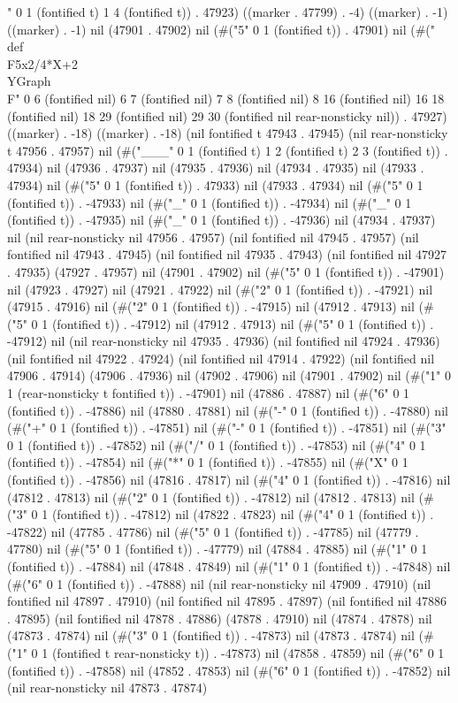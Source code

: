    " 0 1 (fontified t) 1 4 (fontified t)) . 47923) ((marker . 47799) . -4) ((marker) . -1) ((marker) . -1) nil (47901 . 47902) nil (#("5" 0 1 (fontified t)) . 47901) nil (#("\\def\\F5x{2/4*X+2}
   \\YGraph\\F" 0 6 (fontified nil) 6 7 (fontified nil) 7 8 (fontified nil) 8 16 (fontified nil) 16 18 (fontified nil) 18 29 (fontified nil) 29 30 (fontified nil rear-nonsticky nil)) . 47927) ((marker) . -18) ((marker) . -18) (nil fontified t 47943 . 47945) (nil rear-nonsticky t 47956 . 47957) nil (#("___" 0 1 (fontified t) 1 2 (fontified t) 2 3 (fontified t)) . 47934) nil (47936 . 47937) nil (47935 . 47936) nil (47934 . 47935) nil (47933 . 47934) nil (#("5" 0 1 (fontified t)) . 47933) nil (47933 . 47934) nil (#("5" 0 1 (fontified t)) . -47933) nil (#("_" 0 1 (fontified t)) . -47934) nil (#("_" 0 1 (fontified t)) . -47935) nil (#("_" 0 1 (fontified t)) . -47936) nil (47934 . 47937) nil (nil rear-nonsticky nil 47956 . 47957) (nil fontified nil 47945 . 47957) (nil fontified nil 47943 . 47945) (nil fontified nil 47935 . 47943) (nil fontified nil 47927 . 47935) (47927 . 47957) nil (47901 . 47902) nil (#("5" 0 1 (fontified t)) . -47901) nil (47923 . 47927) nil (47921 . 47922) nil (#("2" 0 1 (fontified t)) . -47921) nil (47915 . 47916) nil (#("2" 0 1 (fontified t)) . -47915) nil (47912 . 47913) nil (#("5" 0 1 (fontified t)) . -47912) nil (47912 . 47913) nil (#("5" 0 1 (fontified t)) . -47912) nil (nil rear-nonsticky nil 47935 . 47936) (nil fontified nil 47924 . 47936) (nil fontified nil 47922 . 47924) (nil fontified nil 47914 . 47922) (nil fontified nil 47906 . 47914) (47906 . 47936) nil (47902 . 47906) nil (47901 . 47902) nil (#("1" 0 1 (rear-nonsticky t fontified t)) . -47901) nil (47886 . 47887) nil (#("6" 0 1 (fontified t)) . -47886) nil (47880 . 47881) nil (#("-" 0 1 (fontified t)) . -47880) nil (#("+" 0 1 (fontified t)) . -47851) nil (#("-" 0 1 (fontified t)) . -47851) nil (#("3" 0 1 (fontified t)) . -47852) nil (#("/" 0 1 (fontified t)) . -47853) nil (#("4" 0 1 (fontified t)) . -47854) nil (#("*" 0 1 (fontified t)) . -47855) nil (#("X" 0 1 (fontified t)) . -47856) nil (47816 . 47817) nil (#("4" 0 1 (fontified t)) . -47816) nil (47812 . 47813) nil (#("2" 0 1 (fontified t)) . -47812) nil (47812 . 47813) nil (#("3" 0 1 (fontified t)) . -47812) nil (47822 . 47823) nil (#("4" 0 1 (fontified t)) . -47822) nil (47785 . 47786) nil (#("5" 0 1 (fontified t)) . -47785) nil (47779 . 47780) nil (#("5" 0 1 (fontified t)) . -47779) nil (47884 . 47885) nil (#("1" 0 1 (fontified t)) . -47884) nil (47848 . 47849) nil (#("1" 0 1 (fontified t)) . -47848) nil (#("6" 0 1 (fontified t)) . -47888) nil (nil rear-nonsticky nil 47909 . 47910) (nil fontified nil 47897 . 47910) (nil fontified nil 47895 . 47897) (nil fontified nil 47886 . 47895) (nil fontified nil 47878 . 47886) (47878 . 47910) nil (47874 . 47878) nil (47873 . 47874) nil (#("3" 0 1 (fontified t)) . -47873) nil (47873 . 47874) nil (#("1" 0 1 (fontified t rear-nonsticky t)) . -47873) nil (47858 . 47859) nil (#("6" 0 1 (fontified t)) . -47858) nil (47852 . 47853) nil (#("6" 0 1 (fontified t)) . -47852) nil (nil rear-nonsticky nil 47873 . 47874) 